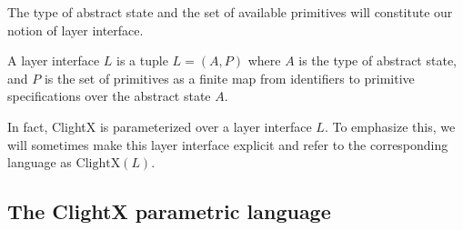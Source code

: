 The type of abstract state and the set of available primitives
will constitute our notion of layer interface.

\begin{definition} \label{def:c-layer}
A layer interface $L$ is a tuple $ L = (A, P) $
where $A$ is the type of abstract state, and $P$ is the set of
primitives as a finite map from identifiers to primitive specifications
over the abstract state $A$.
\end{definition}


In fact,
ClightX is parameterized over a layer interface $L$.
To emphasize this,
we will sometimes make this layer interface explicit
and refer to the corresponding language as $\text{ClightX}(L)$.


\subsection{The ClightX parametric language}

